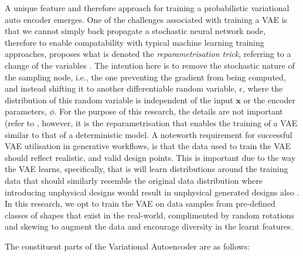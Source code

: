 \documentclass{article}
\begin{document}
A unique feature and therefore approach for training a probabilistic variational auto encoder emerges. One of the challenges associated with training a VAE is that we cannot simply back propagate a stochastic neural network node, therefore to enable compatability with typical machine learning training approaches, \cite{Kingma2013} proposes what is denoted the \textit{reparametrisation trick}, referring to a change of the variables \citep{Kingma2019}. The intention here is to remove the stochastic nature of the sampling node, i.e., the one preventing the gradient from being computed, and instead shifting it to another differentiable random variable, $\epsilon$, where the distribution of this random variable is independent of the input $\textbf{x}$ or the encoder parameters, $\phi$. For the purpose of this research, the details are not important (refer to \citep{Kingma2013}, however, it is the reparametrisation that enables the training of a VAE similar to that of a deterministic model. A noteworth requirement for successful VAE utilisation in generative workflows, is that the data used to train the VAE should reflect realistic, and valid design points. This is important due to the way the VAE learns, specifically, that is will learn distributions around the training data that should similarly resemble the original data distribution where introducing unphysical designs would result in unphysical generated designs also \citep{Huang2022}. In this research, we opt to train the VAE on data samples from pre-defined classes of shapes that exist in the real-world, complimented by random rotations and skewing to augment the data and encourage diversity in the learnt features.

The constituent parts of the Variational Autoencoder are as follows:
\end{document}
